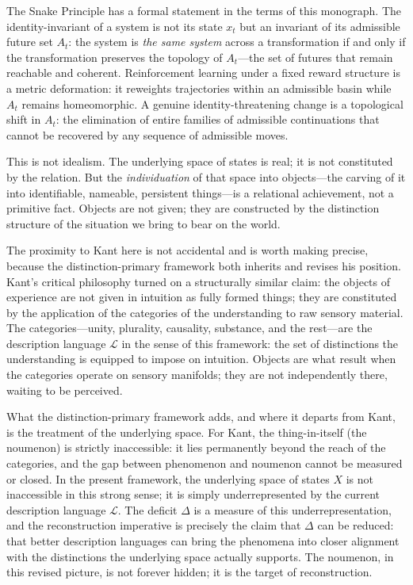 \documentclass[12pt, letterpaper]{article}
\theoremstyle{remark}
\begin{document}
The Snake Principle has a formal statement in the terms of this monograph.
The identity-invariant of a system is not its state $x_t$ but an invariant
of its admissible future set $A_t$: the system is \emph{the same system}
across a transformation if and only if the transformation preserves the
topology of $A_t$---the set of futures that remain reachable and coherent.
Reinforcement learning under a fixed reward structure is a metric
deformation: it reweights trajectories within an admissible basin while
$A_t$ remains homeomorphic.  A genuine identity-threatening change is a
topological shift in $A_t$: the elimination of entire families of admissible
continuations that cannot be recovered by any sequence of admissible moves.

This is not idealism.  The underlying space of states is real; it is not
constituted by the relation.  But the \emph{individuation} of that space
into objects---the carving of it into identifiable, nameable, persistent
things---is a relational achievement, not a primitive fact.  Objects are
not given; they are constructed by the distinction structure of the situation
we bring to bear on the world.

The proximity to Kant here is not accidental and is worth making precise,
because the distinction-primary framework both inherits and revises his
position.  Kant's critical philosophy turned on a structurally similar claim:
the objects of experience are not given in intuition as fully formed things;
they are constituted by the application of the categories of the understanding
to raw sensory material.  The categories---unity, plurality, causality,
substance, and the rest---are the description language $\mathcal{L}$ in the
sense of this framework: the set of distinctions the understanding is equipped
to impose on intuition.  Objects are what result when the categories operate
on sensory manifolds; they are not independently there, waiting to be
perceived.

What the distinction-primary framework adds, and where it departs from Kant,
is the treatment of the underlying space.  For Kant, the thing-in-itself
(the noumenon) is strictly inaccessible: it lies permanently beyond the
reach of the categories, and the gap between phenomenon and noumenon cannot
be measured or closed.  In the present framework, the underlying space of
states $X$ is not inaccessible in this strong sense; it is simply
underrepresented by the current description language $\mathcal{L}$.  The
deficit $\Delta$ is a measure of this underrepresentation, and the
reconstruction imperative is precisely the claim that $\Delta$ can be
reduced: that better description languages can bring the phenomena into
closer alignment with the distinctions the underlying space actually supports.
The noumenon, in this revised picture, is not forever hidden; it is the
target of reconstruction.
\end{document}

